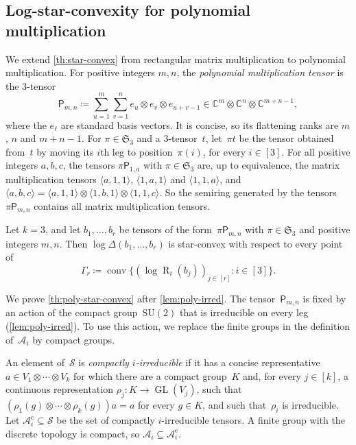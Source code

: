 \documentclass[11pt,letterpaper]{article}
\DeclareMathOperator{\tensorrank}{R}
\newcommand{\polymult}{\mathsf{P}}
\newcommand{\CC}{\mathbb{C}}
\DeclareMathOperator{\GL}{GL}
\DeclareMathOperator{\conv}{conv}
\begin{document}
\subsection{Log-star-convexity for polynomial multiplication}\label{sec:poly-complex}

We extend \cref{th:star-convex} from rectangular matrix multiplication to polynomial multiplication. For positive integers $m, n$, the \emph{polynomial multiplication tensor} is the $3$-tensor
\begin{equation}\label{eq:poly-tensor}
\polymult_{m,n} \coloneqq \sum_{u=1}^{m} \sum_{v=1}^{n} e_u \otimes e_v \otimes e_{u+v-1} \in \CC^m \otimes \CC^n \otimes \CC^{m+n-1},
\end{equation}
where the $e_\ell$ are standard basis vectors. It is concise, so its flattening ranks are $m$, $n$ and $m+n-1$. For $\pi \in \mathfrak{S}_3$ and a $3$-tensor~$t$, let~$\pi t$ be the tensor obtained from~$t$ by moving its $i$th leg to position~$\pi(i)$, for every $i \in [3]$. For all positive integers $a, b, c$, the tensors $\pi\polymult_{1,a}$ with $\pi \in \mathfrak{S}_3$ are, up to equivalence, the matrix multiplication tensors $\langle a,1,1 \rangle$, $\langle 1,a,1 \rangle$ and $\langle 1,1,a \rangle$, and $\langle a,b,c \rangle = \langle a,1,1 \rangle \otimes \langle 1,b,1 \rangle \otimes \langle 1,1,c \rangle$. So the semiring generated by the tensors~$\pi\polymult_{m,n}$ contains all matrix multiplication tensors.

\begin{theorem}\label{th:poly-star-convex}
Let $k = 3$, and let $b_1, \ldots, b_r$ be tensors of the form~$\pi\polymult_{m,n}$ with $\pi \in \mathfrak{S}_3$ and positive integers $m, n$. Then $\log \Delta(b_1, \ldots, b_r)$ is star-convex with respect to every point of
\[
\Gamma_r \coloneqq \conv\bigl\{ (\log \tensorrank_i(b_j))_{j \in [r]} : i \in [3] \bigr\}.
\]
\end{theorem}

We prove \cref{th:poly-star-convex} after \cref{lem:poly-irred}. The tensor~$\polymult_{m,n}$ is fixed by an action of the compact group~$\mathrm{SU}(2)$ that is irreducible on every leg (\cref{lem:poly-irred}). To use this action, we replace the finite groups in the definition of~$\mathcal{A}_i$ by compact groups.

An element of~$\mathcal{S}$ is \emph{compactly $i$-irreducible} if it has a concise representative $a \in V_1 \otimes \cdots \otimes V_k$ for which there are a compact group~$K$ and, for every $j \in [k]$, a continuous representation $\rho_j : K \to \GL(V_j)$, such that $(\rho_1(g) \otimes \cdots \otimes \rho_k(g))a = a$ for every $g \in K$, and such that~$\rho_i$ is irreducible. Let $\mathcal{A}^{\mathrm{c}}_i \subseteq \mathcal{S}$ be the set of compactly $i$-irreducible tensors. A finite group with the discrete topology is compact, so $\mathcal{A}_i \subseteq \mathcal{A}^{\mathrm{c}}_i$.
\end{document}
